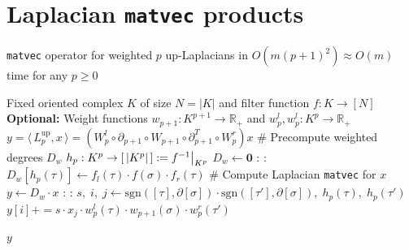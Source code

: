 \documentclass[10pt]{article}
\numberwithin{equation}{section}
\newcommand{\+}{%
	\raisebox{0.18ex}{\scaleobj{0.55}{+}}
}
\newcommand\restr[2]{{%
  \left.\kern-\nulldelimiterspace %
  #1 %
  \vphantom{\big|} %
  \right|_{#2} %
  }}
\theoremstyle{definition}
\begin{document}
\newlength\myindent 
\setlength\myindent{6em} 
\newcommand\bindent{
  \begingroup 
  \setlength{\itemindent}{\myindent} 
  \addtolength{\algorithmicindent}{\myindent} 
}
\newcommand\eindent{\endgroup} %

\section{Laplacian \texttt{matvec} products}\label{sec:up_laplace_matvec}
\begin{algorithm}
\caption{\texttt{matvec} operator for weighted $p$ up-Laplacians in $O(m(p+1)^2) \approx O(m)$ time for any $p \geq 0$}	
\begin{algorithmic}
\Require Fixed oriented complex $K$ of size $N=\lvert K \rvert$ and filter function $f: K \to [N]$ \\
\hspace{-1.38em} \textbf{Optional:} Weight functions $w_{p+1}: K^{p+1} \to \mathbb{R}_{+}$ and  $w_{p}^l, w_{p}^l: K^p \to \mathbb{R}_{+}$
\Ensure $y = \langle \, L_p^{\mathrm{up}}, x \, \rangle = (W_p^{l} \circ \partial_{p+1} \circ W_{p+1} \circ \partial_{p+1}^T \circ W_p^{r}) x$
\vspace{0.25em}
\State \# Precompute weighted degrees $D_w$ 
\State $h_p : K^p \to [ \, \lvert K^p \rvert \, ] := \restr{f^{-1}}{K^p}$
\State $D_w \gets \mathbf{0}$
: 
	\For{$\tau \in \partial[\sigma]$}:
   	 	\State $D_w[h_p(\tau)] \gets f_l(\tau) \cdot f(\sigma) \cdot  f_r(\tau)$
   	\EndFor
\EndFor
\State 
\State \# Compute Laplacian \texttt{matvec} for $x$ 
\State $y \gets D_w \cdot x$ %
:
    : 
    		\State $s, \; i, \; j \gets \mathrm{sgn}([\tau], \partial[\sigma]) \cdot \mathrm{sgn}([\tau'], \partial[\sigma]), \; h_p(\tau), \; h_p(\tau')$
    		\State $y[i] \mathrel{{+}{=}} s \cdot x_{j} \cdot w_p^l(\tau) \cdot w_{p+1}(\sigma) \cdot w_p^r(\tau')$
    \EndFor 
\EndFor

\Return $y$
\EndFunction
\end{algorithmic}
\end{algorithm}
\end{document}
